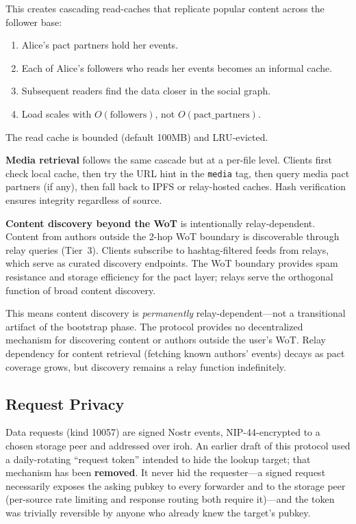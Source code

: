 \documentclass[11pt,a4paper]{article}
\begin{document}
This creates cascading read-caches that replicate popular content across the follower base:

\begin{enumerate}
  \item Alice's pact partners hold her events.
  \item Each of Alice's followers who reads her events becomes an informal cache.
  \item Subsequent readers find the data closer in the social graph.
  \item Load scales with $O(\text{followers})$, not $O(\text{pact\_partners})$.
\end{enumerate}

The read cache is bounded (default 100MB) and LRU-evicted.

\textbf{Media retrieval} follows the same cascade but at a per-file level. Clients first check local cache, then try the URL hint in the \texttt{media} tag, then query media pact partners (if any), then fall back to IPFS or relay-hosted caches. Hash verification ensures integrity regardless of source.

\textbf{Content discovery beyond the WoT} is intentionally relay-dependent. Content from authors outside the 2-hop WoT boundary is discoverable through relay queries (Tier~3). Clients subscribe to hashtag-filtered feeds from relays, which serve as curated discovery endpoints. The WoT boundary provides spam resistance and storage efficiency for the pact layer; relays serve the orthogonal function of broad content discovery.

This means content discovery is \emph{permanently} relay-dependent---not a transitional artifact of the bootstrap phase. The protocol provides no decentralized mechanism for discovering content or authors outside the user's WoT. Relay dependency for content retrieval (fetching known authors' events) decays as pact coverage grows, but discovery remains a relay function indefinitely.

\subsection{Request Privacy}

Data requests (kind 10057) are signed Nostr events, NIP-44-encrypted to a chosen storage peer and addressed over iroh. An earlier draft of this protocol used a daily-rotating ``request token'' intended to hide the lookup target; that mechanism has been \textbf{removed}. It never hid the requester---a signed request necessarily exposes the asking pubkey to every forwarder and to the storage peer (per-source rate limiting and response routing both require it)---and the token was trivially reversible by anyone who already knew the target's pubkey.
\end{document}
